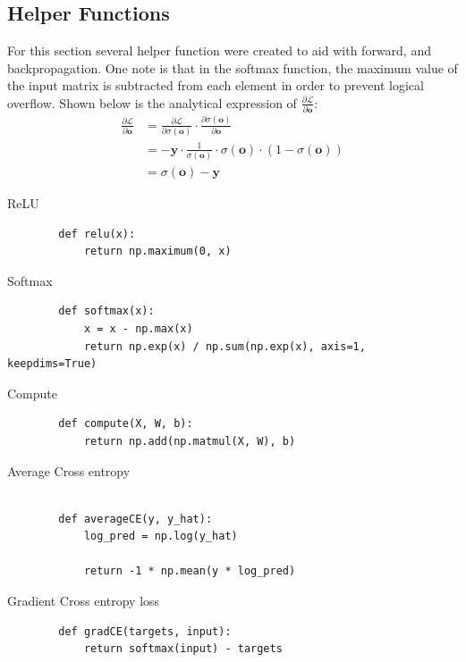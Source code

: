 \documentclass[12pt]{article}
\begin{document}
\subsection{Helper Functions}
For this section several helper function were created to aid with forward, and backpropagation.
One note is that in the softmax function, the maximum value of the input matrix is subtracted from
each element in order to prevent logical overflow.
Shown below is the analytical expression of $\frac{\partial \mathcal{L}}{\partial \mathbf{o}}$:
\begin{equation}
  \begin{split}
    \frac{\partial \mathcal{L}}{\partial \mathbf{o}} & = \frac{\partial \mathcal{L}}{\partial \sigma(\mathbf{o})} \cdot \frac{\partial \sigma(\mathbf{o})}{\partial \mathbf{o}} \\
    & = - \mathbf{y} \cdot \frac{1}{\sigma (\mathbf{o})} \cdot \sigma (\mathbf{o}) \cdot (1 - \sigma (\mathbf{o})) \\
    & = \sigma (\mathbf{o}) - \mathbf{y}
  \end{split}
\end{equation}
\begin{description}
  \item{ReLU}
        \begin{verbatim}
        def relu(x):
            return np.maximum(0, x)
        \end{verbatim}
  \item{Softmax}
        \begin{verbatim}
        def softmax(x):
            x = x - np.max(x)
            return np.exp(x) / np.sum(np.exp(x), axis=1, keepdims=True)
        \end{verbatim}
  \item{Compute}
        \begin{verbatim}
        def compute(X, W, b):
            return np.add(np.matmul(X, W), b)
    \end{verbatim}
  \item{Average Cross entropy}
        \begin{verbatim}

        def averageCE(y, y_hat):
            log_pred = np.log(y_hat)

            return -1 * np.mean(y * log_pred)
    \end{verbatim}
  \item{Gradient Cross entropy loss}
        \begin{verbatim}
        def gradCE(targets, input):
            return softmax(input) - targets
        \end{verbatim}
\end{description}
\end{document}
